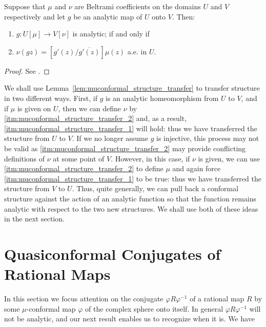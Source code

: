 \begin{lemma}
    \label{lem:muconformal_structure_transfer}
    Suppose that $\mu$ and $\nu$ are Beltrami coefficients on the domains $U$
    and $V$ respectively and let $g$ be an analytic map of $U$ onto $V$. Then:
    \begin{enumerate}[label=(\roman*)]
        \item \label{itm:muconformal_structure_transfer_1} $g: U[\mu] \to
        V[\nu]$ is analytic; if and only if
        \item \label{itm:muconformal_structure_transfer_2} $\nu(gz) =
        [g'(z)/\overline{g'(z)}]\mu(z)$ a.e. in $U$.
    \end{enumerate}
\end{lemma}
\begin{proof}
    See \cite[182]{Beardon1991}.
\end{proof}

We shall use Lemma~\ref{lem:muconformal_structure_transfer} to transfer
structure in two different ways. First, if $g$ is an analytic homeomorphism from
$U$ to $V$, and if $\mu$ is given on $U$, then we can define $\nu$ by
\ref{itm:muconformal_structure_transfer_2} and, as a result,
\ref{itm:muconformal_structure_transfer_1} will hold: thus we have transferred
the structure from $U$ to $V$. If we no longer assume $g$ is injective, this
process may not be valid as \ref{itm:muconformal_structure_transfer_2} may
provide conflicting definitions of $\nu$ at some point of $V$. However, in this
case, if $\nu$ is given, we can use \ref{itm:muconformal_structure_transfer_2}
to define $\mu$ and again force \ref{itm:muconformal_structure_transfer_1} to be
true: thus we have transferred the structure from $V$ to $U$. Thus, quite
generally, we can pull back a conformal structure against the action of an
analytic function so that the function remains analytic with respect to the two
new structures. We shall use both of these ideas in the next section.

\section{Quasiconformal Conjugates of Rational Maps}
\label{sec:quasiconformal_conjugates_of_rational_maps}

In this section we focus attention on the conjugate $\varphi R \varphi^{-1}$ of
a rational map $R$ by some $\mu$-conformal map $\varphi$ of the complex sphere
onto itself. In general $\varphi R \varphi^{-1}$ will not be analytic, and our
next result enables us to recognize when it is. We have


